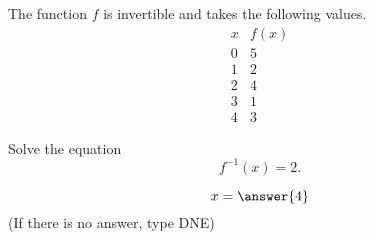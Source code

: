 \documentclass{ximera}
\author{Bobby Ramsey}
\begin{document}
\begin{exercise}


\outcome{}
\outcome{}
\outcome{}


The function $f$ is invertible and takes the following values.
\[
\begin{array}{c|c}
  x & f(x)\\\hline
  0 & 5\\
  1 & 2\\
  2 & 4\\
  3 & 1\\
  4 & 3
\end{array}
\]

Solve the equation \[ f^{-1}(x) = 2. \]

\[ x = \answer{4}\]
(If there is no answer, type DNE)

\end{exercise}
\end{document}
